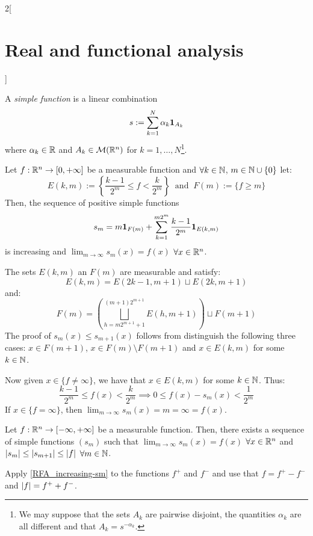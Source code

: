 \documentclass[../../../main_math.tex]{subfiles}
\begin{document}
\begin{multicols}{2}[\section{Real and functional analysis}]
\begin{definition}
    A \emph{simple function} is a linear combination $$s:=\sum_{k=1}^N\alpha_k\boldsymbol{\mathrm{1}}_{A_k}$$ where $\alpha_k\in\mathbb{R}$ and $A_k\in\mathcal{M}(\mathbb{R}^n)$ for $k=1,\ldots,N$\footnote{We may suppose that the sets $A_k$ are pairwise disjoint, the quantities $\alpha_k$ are all different and that $A_k=s^{-\alpha_k}$.}.
  \end{definition}
  \begin{theorem}\label{RFA_increasing-sm}
    Let $f:\mathbb{R}^n\rightarrow[0,+\infty]$ be a measurable function and $\forall k\in\mathbb{N}$, $m\in\mathbb{N}\cup\{0\}$ let: $$E(k,m):=\left\{\frac{k-1}{2^m}\leq f<\frac{k}{2^m}\right\}\;\;\text{and}\;\; F(m):=\{f\geq m\}$$
    Then, the sequence of positive simple functions $$s_m=m\boldsymbol{\mathrm{1}}_{F(m)}+\sum_{k=1}^{m2^m}\frac{k-1}{2^m}\boldsymbol{\mathrm{1}}_{E(k,m)}$$ is increasing and $\displaystyle\lim_{m\to\infty}s_m(x)=f(x)$ $\forall x\in\mathbb{R}^n$.
  \end{theorem}
  \begin{sproof}
    The sets $E(k,m)$ an $F(m)$ are measurable and satisfy:
    \begin{equation*}
      E(k,m)=E(2k-1,m+1)\sqcup E(2k,m+1)
    \end{equation*}
    and:
    \begin{equation*}
      F(m)=\left(\bigsqcup_{h=m2^{m+1}+1}^{(m+1)2^{m+1}}E(h,m+1)\right)\sqcup F(m+1)
    \end{equation*}
    The proof of $s_m(x)\leq s_{m+1}(x)$ follows from distinguish the following three cases: $x\in F(m+1)$, $x\in F(m)\setminus F(m+1)$ and $x\in E(k,m)$ for some $k\in\mathbb{N}$.

    Now given $x\in\{f\ne\infty\}$, we have that $x\in E(k,m)$ for some $k\in\mathbb{N}$. Thus:
    $$\frac{k-1}{2^m}\leq f(x)<\frac{k}{2^m}\implies 0\leq f(x)-s_m(x)<\frac{1}{2^m}$$
    If $x\in\{f=\infty\}$, then $\displaystyle\lim_{m\to\infty}s_m(x)=m=\infty=f(x)$.
  \end{sproof}
  \begin{theorem}
    Let $f:\mathbb{R}^n\rightarrow[-\infty,+\infty]$ be a measurable function. Then, there exists a sequence of simple functions $(s_m)$ such that $\displaystyle\lim_{m\to\infty}s_m(x)=f(x)$ $\forall x\in\mathbb{R}^n$ and $\abs{s_m}\leq\abs{s_{m+1}}\leq \abs{f}$ $\forall m\in\mathbb{N}$.
  \end{theorem}
  \begin{sproof}
    Apply \cref{RFA_increasing-sm} to the functions $f^+$ and $f^-$ and use that $f=f^+-f^-$ and $\abs{f}=f^++f^-$.
  \end{sproof}

\end{multicols}
\end{document}
